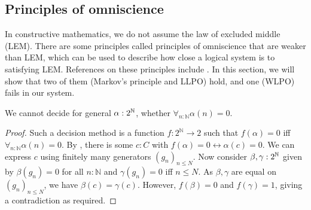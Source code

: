 \subsection{Principles of omniscience}
In constructive mathematics, we do not assume the law of excluded middle (LEM).
There are some principles called principles of omniscience that are weaker than LEM, which can be used to describe 
how close a logical system is to satisfying LEM.
References on these principles include \cite{HannesDiener, ReverseMathsBishop}.
In this section, we will show that two of them (Markov's principle and LLPO) hold, 
and one (WLPO) fails in our system.

\begin{theorem}\label{NotWLPO}
  We cannot decide for general $\alpha:2^{\mathbb{N}}$, whether $\forall_{n:\mathbb N} \alpha(n) = 0$.
\end{theorem}
\begin{proof}
  Such a decision method is a function $f:2^\mathbb N \to 2$ such that 
  $f(\alpha) = 0$ iff $\forall_{n:\mathbb N} \alpha (n)= 0$. 
  By , there is some $c:C$ with 
  $f(\alpha) = 0 \leftrightarrow \alpha(c) = 0$. 
  We can express $c$ using finitely many generators $(g_n)_{n\leq N}$. 
  Now consider $\beta,\gamma:2^{\mathbb{N}}$ given by 
  $\beta(g_n) = 0$ for all $n:\mathbb N$ and
  $\gamma(g_n) = 0$ iff $n\leq N$. 
  As $\beta, \gamma$ are equal on $(g_n)_{n\leq N}$, we have $\beta(c) = \gamma(c)$. 
  However, $f(\beta) = 0$ and $f(\gamma) = 1$, giving a contradiction as required. 
\end{proof}

